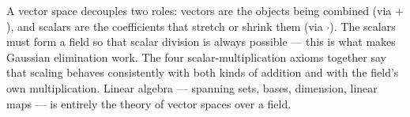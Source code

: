 \begin{remark}
  A vector space decouples two roles: vectors are the objects being combined
  (via $+$), and scalars are the coefficients that stretch or shrink them
  (via $\cdot$).  The scalars must form a field so that scalar division is
  always possible — this is what makes Gaussian elimination work.  The four
  scalar-multiplication axioms together say that scaling behaves consistently
  with both kinds of addition and with the field's own multiplication.  Linear
  algebra — spanning sets, bases, dimension, linear maps — is entirely the
  theory of vector spaces over a field.
\end{remark}

